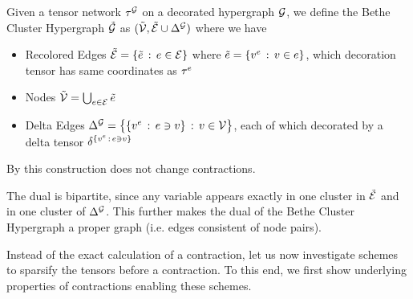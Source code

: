 \begin{definition}
	Given a tensor network $\tau^{\mathcal{G}}$ on a decorated hypergraph $\mathcal{G}$, we define the Bethe Cluster Hypergraph $\tilde{\mathcal{G}}$ as
	$(\tilde{\mathcal{V}}, \tilde{\mathcal{E}} \cup \Delta^{\mathcal{G}})$ where we have
	\begin{itemize}
		\item Recolored Edges $\tilde{\mathcal{E}} = \{\tilde{e} \,:\, e\in \mathcal{E}\}$ where $\tilde{e} = \{v^{e} \,:\, v\in e\}$, which decoration tensor has same coordinates as $\tau^{e}$
		\item Nodes $\tilde{\mathcal{V}} = \bigcup_{e\in\mathcal{E}}\tilde{e}$ %
		\item Delta Edges $\Delta^{\mathcal{G}} =  \big\{ \{v^{e} \,:\, e\ni v \} \,:\, v\in\mathcal{V} \big\} $, each of which decorated by a delta tensor $\delta^{\{v^{e} \,:\, e\ni v \}}$
	\end{itemize}
\end{definition}

By  this construction does not change contractions.

The dual is bipartite, since any variable appears exactly in one cluster in $\tilde{\mathcal{E}}$ and in one cluster of $\Delta^{\mathcal{G}}$.
This further makes the dual of the Bethe Cluster Hypergraph a proper graph (i.e. edges consistent of node pairs). 





%
%
%




\label{sec:supportContractionEquations}

Instead of the exact calculation of a contraction, let us now investigate schemes to sparsify the tensors before a contraction.
To this end, we first show underlying properties of contractions enabling these schemes.


